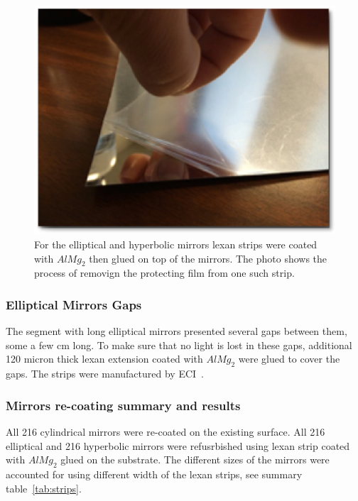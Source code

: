 \begin{figure}
\centering
	\includegraphics[width=0.98\columnwidth,keepaspectratio]{img/filmOnStrip.png}
	\caption{For the elliptical and hyperbolic mirrors lexan strips were coated with $AlMg_2$ then glued on top of the mirrors. The photo shows
            the process of removign the protecting film from one such strip.}
	\label{fig:filmOnStrip}
\end{figure}


\subsubsection{Elliptical Mirrors Gaps}

The segment with long elliptical mirrors presented several gaps between them, some a few cm long. To make sure that no light is lost in these gaps,
additional 120 micron thick lexan extension coated with $AlMg_2$ were glued to cover the gaps. The strips were manufactured by ECI~\cite{ECI}.



\subsubsection{Mirrors re-coating summary and results}

All 216 cylindrical mirrors were re-coated on the existing surface. All 216 elliptical and 216 hyperbolic mirrors were refusrbished using lexan strip
coated with $AlMg_2$ glued on the substrate. The different sizes of the mirrors were accounted for using different width of the lexan strips, see
summary table~\ref{tab:strips}.


